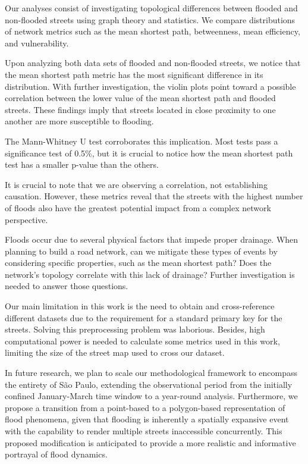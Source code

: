 \documentclass[sn-nature]{sn-jnl}%
\theoremstyle{thmstyleone}%
\theoremstyle{thmstyletwo}%
\theoremstyle{thmstylethree}%
\begin{document}
Our analyses consist of investigating topological differences between flooded and non-flooded streets using graph theory and statistics. We compare distributions of network metrics such as the mean shortest path, betweenness, mean efficiency, and vulnerability.

Upon analyzing both data sets of flooded and non-flooded streets, we notice that the mean shortest path metric has the most significant difference in its distribution. With further investigation, the violin plots point toward a possible correlation between the lower value of the mean shortest path and flooded streets. These findings imply that streets located in close proximity to one another are more susceptible to flooding.

The Mann-Whitney U test corroborates this implication. Most tests pass a significance test of 0.5\%, but it is crucial to notice how the mean shortest path test has a smaller p-value than the others.


It is crucial to note that we are observing a correlation, not establishing causation. However, these metrics reveal that the streets with the highest number of floods also have the greatest potential impact from a complex network perspective.



Floods occur due to several physical factors that impede proper drainage. When planning to build a road network, can we mitigate these types of events by considering specific properties, such as the mean shortest path? Does the network's topology correlate with this lack of drainage? Further investigation is needed to answer those questions.


Our main limitation in this work is the need to obtain and cross-reference different datasets due to the requirement for a standard primary key for the streets. Solving this preprocessing problem was laborious. Besides, high computational power is needed to calculate some metrics used in this work, limiting the size of the street map used to cross our dataset.

In future research, we plan to scale our methodological framework to encompass the entirety of São Paulo, extending the observational period from the initially confined January-March time window to a year-round analysis. Furthermore, we propose a transition from a point-based to a polygon-based representation of flood phenomena, given that flooding is inherently a spatially expansive event with the capability to render multiple streets inaccessible concurrently. This proposed modification is anticipated to provide a more realistic and informative portrayal of flood dynamics.
\\
\end{document}

